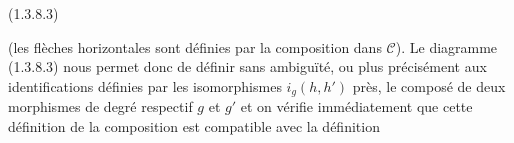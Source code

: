 \begin{center}
  \hfill\textup{(1.3.8.3)}
\end{center}

(les flèches horizontales sont définies par la composition dans
$\mathcal C$). Le diagramme (1.3.8.3) nous permet donc de définir sans
ambiguïté, ou plus précisément aux identifications définies par les
isomorphismes $i_g(h,h')$ près, le composé de deux morphismes de degré
respectif $g$ et $g'$ et on vérifie immédiatement que cette définition
de la composition est compatible avec la définition
